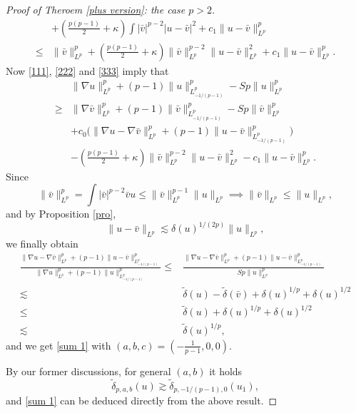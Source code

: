 \documentclass[11pt]{article}
\numberwithin{equation}{section}
\begin{document}
\begin{proof}[Proof of Theroem \ref{plus version}: the case $p>2$]
\begin{equation}
\begin{aligned}
            & + \left(\frac{p(p-1)}{2} + \kappa \right)\int |\bar v|^{p-2}|u-\bar v|^2 + c_1\|u-\bar v\|_{L^p}^p \\
            \le{}& \|\bar v\|_{L^p}^p + \left(\frac{p(p-1)}{2} + \kappa \right)\|\bar v\|_{L^p}^{p-2}\|u-\bar v\|_{L^p}^2+c_1\|u-\bar v\|_{L^p}^p.
        \end{aligned}
    \end{equation}
  Now  \eqref{111}, \eqref{222} and \eqref{333}  imply  that
    \begin{align*}
        & \|\nabla u\|_{L^p}^p + (p-1)\|u\|_{L^p_{-1/(p-1)}}^p -Sp\|u\|_{L^p}^p \\
        \ge{}& \|\nabla \bar v\|_{L^p}^p + (p-1)\|\bar v\|_{L^p_{-1/(p-1)}}^p - Sp\|\bar v\|_{L^p}^p \\
        & + c_0 \Big( \|\nabla u-\nabla \bar v\|_{L^p}^p +(p-1)\|u-\bar v\|_{L^p_{-1/(p-1)}}^p \Big) \\
        & - \left(\frac{p(p-1)}{2} + \kappa \right)\|\bar v\|_{L^p}^{p-2}\|u-\bar v\|_{L^p}^2 - c_1\|u-\bar v\|_{L^p}^p.
    \end{align*}
    Since
    \[ \|\bar v\|_{L^p}^p = \int |\bar v|^{p-2}\bar v u \le \|\bar v\|_{L^p}^{p-1}\|u\|_{L^p} \implies \|\bar v\|_{L^p} \le \|u\|_{L^p}, \]
    and by Proposition \ref{pro},
    \[ \|u-\bar v\|_{L^p} \lesssim \delta(u)^{1/(2p)}\|u\|_{L^p},\]
    we finally obtain
    \begin{align*}
        \frac{\|\nabla u-\nabla \bar v\|_{L^p}^p +(p-1)\|u-\bar v\|_{L^p_{-1/(p-1)}}^p}{\|\nabla u\|_{L^p}^p + (p-1) \|u\|_{L^p_{-1/(p-1)}}^p} \le{}& \frac{\|\nabla u-\nabla \bar v\|_{L^p}^p +(p-1)\|u-\bar v\|_{L^p_{-1/(p-1)}}^p}{Sp\|u\|_{L^p}^p}
        \\
        \lesssim{}& \tilde{\delta}(u) - \tilde{\delta}(\bar v) + \delta(u)^{1/p} + \delta(u)^{1/2}\\
        \le{}& \tilde{\delta}(u) + \delta(u)^{1/p} + \delta(u)^{1/2}
        \\
        \lesssim{}& \tilde{\delta}(u)^{1/p},
    \end{align*}
    and we get \eqref{sum 1} with $(a,b,c) = (-\frac{1}{p-1},0,0)$.

    By our former discussions, for general $(a,b)$ it holds
    \[ \tilde{\delta}_{p,a,b}(u) \gtrsim \tilde{\delta}_{p,-1/(p-1),0}(u_1),\]and \eqref{sum 1} can be deduced directly from the above result.
\end{proof}
\end{document}
